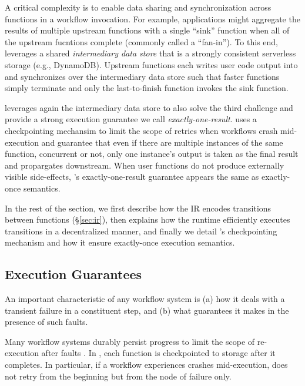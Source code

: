 A critical complexity is to enable data sharing and synchronization across
functions in a workflow invocation. For example, applications might aggregate
the results of multiple upstream functions with a single ``sink'' function
when all of the upstream fucntions complete (commonly called a ``fan-in''). To
this end, \name{} leverages a shared \emph{intermediary data store} that is a
strongly consistent serverless storage (e.g., DynamoDB). Upstream functions
each writes user code output into and synchronizes over the intermediary data
store such that faster functions simply terminate and only the last-to-finish
function invokes the sink function.

\name{} leverages again the intermediary data store to also solve the third
challenge and provide a strong execution guarantee we call
\emph{exactly-one-result}. \name{} uses a checkpointing mechansim to limit the
scope of retries when workflows crash mid-execution and guarantee that even if
there are multiple instances of the same function, concurrent or not, only one
instance's output is taken as the final result and propargates downstream.
When user functions do not produce externally visible side-effects, \name{}'s
exactly-one-result guarantee appears the same as exactly-once semantics.

In the rest of the section, we first describe how the \name{} IR encodes
transitions between functions (\S\ref{sec:ir}), then explains how the \name{}
runtime efficiently executes transitions in a decentralized manner, and
finally we detail \name{}'s checkpointing mechanism and how it ensure
exactly-once execution semantics.









\subsection{Execution Guarantees}\label{sec:exec-gntee}

An important characteristic of any workflow system is (a) how it deals with  a
transient failure in a constituent step, and (b) what guarantees it makes in
the presence of such faults.
 
Many workflow systems durably persist progress to limit the scope of re-execution after faults
\cite{aws-step-functions, durable-functions, netherite, google-workflows, kappa}.
In \name{}, each function is checkpointed to storage after it
completes. In particular, if a workflow experiences crashes mid-execution,
\name{} does not retry from the beginning but from the node of failure only.

